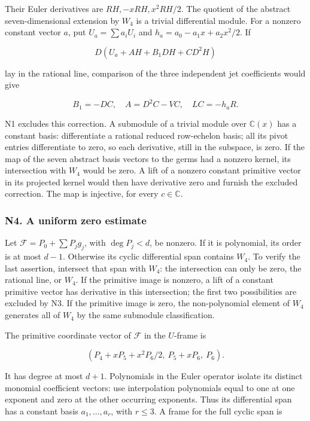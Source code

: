 \documentclass[11pt,a4paper]{article}
\begin{document}
Their Euler derivatives are \(RH,-xRH,x^{2}RH/2\). The quotient of the abstract seven-dimensional extension by \(W_{4}\) is a trivial differential module. For a nonzero constant vector \(a\), put \(U_a=\sum a_iU_i\) and \(h_a=a_{0}-a_{1}x+a_{2}x^{2}/2\). If

\[
D(U_a+AH+B_1DH+CD^2H)
\]

lay in the rational line, comparison of the three independent jet coefficients would give

\[
B_1=-DC,\quad A=D^2C-VC,\quad LC=-h_aR.
\]

N1 excludes this correction. A submodule of a trivial module over \(\mathbb{C}(x)\) has a constant basis: differentiate a rational reduced row-echelon basis; all its pivot entries differentiate to zero, so each derivative, still in the subspace, is zero. If the map of the seven abstract basis vectors to the germs had a nonzero kernel, its intersection with \(W_{4}\) would be zero. A lift of a nonzero constant primitive vector in its projected kernel would then have derivative zero and furnish the excluded correction. The map is injective, for every \(c∈\mathbb{C}\).

\hypertarget{n4.-a-uniform-zero-estimate}{%
\subsubsection{N4. A uniform zero estimate}\label{n4.-a-uniform-zero-estimate}}

Let \(\mathcal{F}=P_{0}+\sum P_jg_j\), with \(\operatorname{deg} P_j<d\), be nonzero. If it is polynomial, its order is at most \(d-1\). Otherwise its cyclic differential span contains \(W_{4}\). To verify the last assertion, intersect that span with \(W_{4}\): the intersection can only be zero, the rational line, or \(W_{4}\). If the primitive image is nonzero, a lift of a constant primitive vector has derivative in this intersection; the first two possibilities are excluded by N3. If the primitive image is zero, the non-polynomial element of \(W_{4}\) generates all of \(W_{4}\) by the same submodule classification.

The primitive coordinate vector of \(\mathcal{F}\) in the \(U\)-frame is

\[
(P_4+xP_5+x^2P_6/2,\ P_5+xP_6,\ P_6).
\]

It has degree at most \(d+1\). Polynomials in the Euler operator isolate its distinct monomial coefficient vectors: use interpolation polynomials equal to one at one exponent and zero at the other occurring exponents. Thus its differential span has a constant basis \(a_{1},\ldots ,a_r\), with \(r≤3\). A frame for the full cyclic span is
\end{document}
